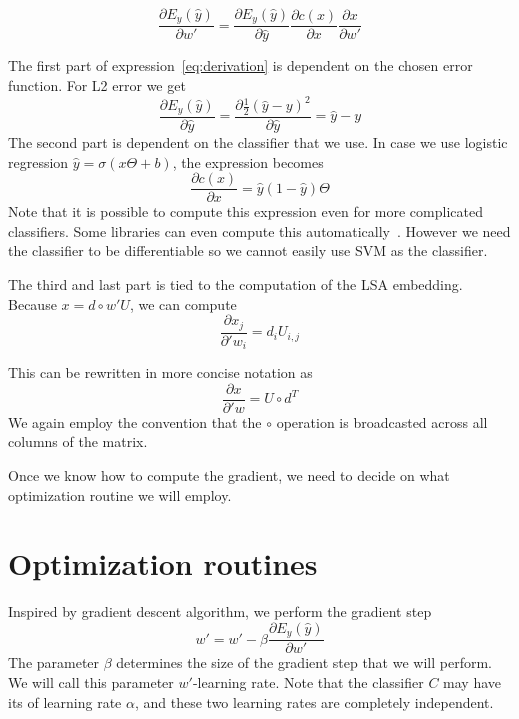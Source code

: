     \begin{equation} \label{eq:derivation}
    \frac{\partial E_y(\hat{y})}{\partial w'} = \frac{\partial E_y(\hat{y})}{\partial \hat{y}} \frac{\partial c(x)}{\partial x} \frac{\partial x}{\partial w'}
    \end{equation}
    
    The first part of expression~\ref{eq:derivation} is dependent on the chosen error function. 
    For L2 error we get 
    \begin{equation}
    \frac{\partial E_y(\hat{y})}{\partial \hat{y}} = \frac{\partial \frac{1}{2}(\hat{y}-y)^2}{\partial \hat{y}} = \hat{y}-y
    \end{equation}
    The second part is dependent on the classifier that we use. 
    In case we use logistic regression $\hat{y} = \sigma(x \Theta + b)$, the expression becomes
    \begin{equation}
    \frac{\partial c(x)}{\partial x} = \hat{y} (1-\hat{y}) \Theta
    \end{equation}
    Note that it is possible to compute this expression even for more complicated classifiers. 
    Some libraries can even compute this automatically~\cite{tensorflow2015-whitepaper}.
    However we need the classifier to be differentiable so we cannot easily use SVM as the classifier. 
    
    The third and last part is tied to the computation of the LSA embedding.
    Because $x = d \circ w' U$, we can compute 
    \begin{equation}
    \frac{\partial x_j}{\partial 'w_i} = d_i U_{i,j}
    \end{equation}
    
    This can be rewritten in more concise notation as 
    \begin{equation}
        \frac{\partial x}{\partial 'w} = U \circ d^T
    \end{equation}
    We again employ the convention that the $\circ$ operation is broadcasted across all columns of the matrix.

    Once we know how to compute the gradient, we need to decide on what optimization routine we will employ.

\section{Optimization routines}
    
    Inspired by gradient descent algorithm, we perform the gradient step 
    \begin{equation}
        w' = w' - \beta \frac{\partial E_y(\hat{y})}{\partial w'}
    \end{equation}
    The parameter $\beta$ determines the size of the gradient step that we will perform.
    We will call this parameter $w'$-learning rate. 
    Note that the classifier $C$ may have its of learning rate $\alpha$, and these two learning rates are completely independent.
    
